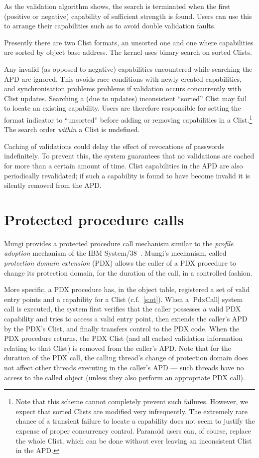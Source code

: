 \documentclass[a4paper,11pt,twoside,dvips]{report}
\begin{document}
As the validation algorithm shows, the search is terminated when the
first (positive or negative) capability of sufficient
strength is found. Users can use this to arrange their capabilities such
as to avoid double validation faults.

Presently there are two Clist formats, an unsorted one and one where
capabilities are sorted by object base address. The kernel uses binary
search on sorted Clists.

Any invalid (as opposed to negative) capabilities
encountered while searching the APD are ignored. This avoids race
conditions with newly created capabilities, and synchronisation problems
problems if validation occurs concurrently with Clist updates. Searching
a (due to updates) inconsistent ``sorted'' Clist may fail to locate an
existing capability.  Users are therefore responsible for setting the
format indicator to ``unsorted'' before adding or removing capabilities
in a Clist.\footnote{Note that this scheme cannot completely prevent
such failures. However, we expect that sorted Clists are modified very
infrequently. The extremely rare chance of a transient failure to locate
a capability does not seem to justify the expense of proper concurrency
control. Paranoid users can, of course, replace the whole Clist, which
can be done without ever leaving an inconsistent Clist in the APD.}
The search order \emph{within} a Clist is undefined.

Caching of validations could delay the effect of revocations of
passwords indefinitely. To prevent this, the system guarantees that no
validations are cached for more than a certain amount of time. Clist
capabilities in the APD are also periodically revalidated; if such a
capability is found to have become invalid it is silently removed from
the APD.

\section{\label{s:pdx}Protected procedure calls}

Mungi provides a protected procedure call mechanism similar to the
\emph{profile adoption} mechanism of the IBM
System/38~\cite{Berstis_80}. Mungi's mechanism, called \emph{protection
domain extension} (PDX) allows the caller of a PDX procedure to change
its protection domain, for the duration of the call, in a controlled
fashion.

More specific, a PDX procedure has, in the object table, registered a
set of valid entry points and a capability for a Clist (c.f.\
\autoref{s:ot}). When a |PdxCall| system call is executed, the system
first verifies that the caller possesses a valid PDX capability and
tries to access a valid entry point, then extends the caller's APD by
the PDX's Clist, and finally transfers control to the PDX code. When the
PDX procedure returns, the PDX Clist (and all cached validation
information relating to that Clist) is removed from the caller's
APD. Note that for the duration of the PDX call, the calling thread's
change of protection domain does not affect other threads executing in
the caller's APD --- such threads have no access to the called object
(unless they also perform an appropriate PDX call).
\end{document}
